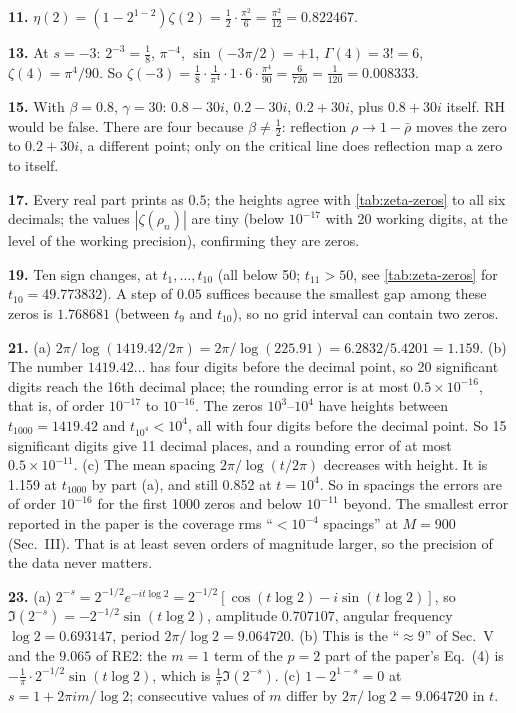 \textbf{11.} $\eta(2)=(1-2^{1-2})\zeta(2)=\tfrac12\cdot\frac{\pi^2}{6}=\frac{\pi^2}{12}=0.822467$.

\textbf{13.} At $s=-3$: $2^{-3}=\frac18$, $\pi^{-4}$, $\sin(-3\pi/2)=+1$, $\Gamma(4)=3!=6$, $\zeta(4)=\pi^4/90$. So $\zeta(-3)=\frac18\cdot\frac1{\pi^4}\cdot1\cdot6\cdot\frac{\pi^4}{90}=\frac{6}{720}=\frac1{120}=0.008333$.

\textbf{15.} With $\beta=0.8$, $\gamma=30$: $0.8-30i$, $0.2-30i$, $0.2+30i$, plus $0.8+30i$ itself. RH would be false. There are four because $\beta\ne\tfrac12$: reflection $\rho\to1-\bar\rho$ moves the zero to $0.2+30i$, a different point; only on the critical line does reflection map a zero to itself.

\textbf{17.} Every real part prints as $0.5$; the heights agree with \cref{tab:zeta-zeros} to all six decimals; the values $|\zeta(\rho_n)|$ are tiny (below $10^{-17}$ with 20 working digits, at the level of the working precision), confirming they are zeros.

\textbf{19.} Ten sign changes, at $t_1,\dots,t_{10}$ (all below 50; $t_{11}>50$, see \cref{tab:zeta-zeros} for $t_{10}=49.773832$). A step of $0.05$ suffices because the smallest gap among these zeros is $1.768681$ (between $t_9$ and $t_{10}$), so no grid interval can contain two zeros.

\textbf{21.} (a) $2\pi/\log(1419.42/2\pi)=2\pi/\log(225.91)=6.2832/5.4201=1.159$. (b) The number $1419.42\ldots$ has four digits before the decimal point, so 20 significant digits reach the 16th decimal place; the rounding error is at most $0.5\times10^{-16}$, that is, of order $10^{-17}$ to $10^{-16}$. The zeros $10^3$--$10^4$ have heights between $t_{1000}=1419.42$ and $t_{10^4}<10^4$, all with four digits before the decimal point. So 15 significant digits give 11 decimal places, and a rounding error of at most $0.5\times10^{-11}$. (c) The mean spacing $2\pi/\log(t/2\pi)$ decreases with height. It is 1.159 at $t_{1000}$ by part (a), and still 0.852 at $t=10^4$. So in spacings the errors are of order $10^{-16}$ for the first 1000 zeros and below $10^{-11}$ beyond. The smallest error reported in the paper is the coverage rms ``$<10^{-4}$ spacings'' at $M=900$ (Sec.~III). That is at least seven orders of magnitude larger, so the precision of the data never matters.

\textbf{23.} (a) $2^{-s}=2^{-1/2}e^{-it\log2}=2^{-1/2}[\cos(t\log2)-i\sin(t\log2)]$, so $\Im(2^{-s})=-2^{-1/2}\sin(t\log2)$, amplitude $0.707107$, angular frequency $\log2=0.693147$, period $2\pi/\log2=9.064720$. (b) This is the ``$\approx9$'' of Sec.~V and the $9.065$ of RE2: the $m=1$ term of the $p=2$ part of the paper's Eq.~(4) is $-\frac1\pi\cdot2^{-1/2}\sin(t\log 2)$, which is $\frac1\pi\Im(2^{-s})$. (c) $1-2^{1-s}=0$ at $s=1+2\pi im/\log2$; consecutive values of $m$ differ by $2\pi/\log2=9.064720$ in $t$.


